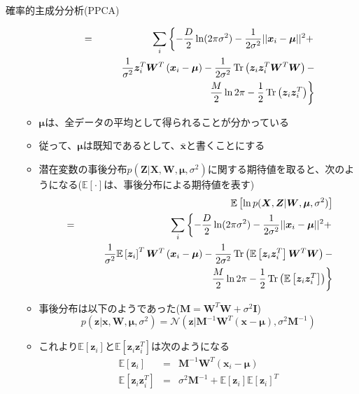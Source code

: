 \documentclass[dvipdfmx,notheorems,t]{beamer}
\begin{document}
\begin{frame}{確率的主成分分析(PPCA)}
\begin{itemize}
\begin{itemize}
\begin{eqnarray}
			&=& \sum_i \left\{ -\frac{D}{2} \ln (2\pi \sigma^2) - \frac{1}{2 \sigma^2} || \bm{x}_i - \bm{\mu} ||^2 + \right. \nonumber \\
			&& \qquad \frac{1}{\sigma^2} \bm{z}_i^T \bm{W}^T \left( \bm{x}_i - \bm{\mu} \right) - \frac{1}{2 \sigma^2} \operatorname{Tr} \left( \bm{z}_i \bm{z}_i^T \bm{W}^T \bm{W} \right) - \nonumber \\
			&& \qquad \left. \frac{M}{2} \ln 2\pi - \frac{1}{2} \operatorname{Tr} \left( \bm{z}_i \bm{z}_i^T \right) \right\}
		\end{eqnarray}
		
		\item $\bm{\mu}$は、全データの平均として得られることが分かっている
		\item 従って、$\bm{\mu}$は既知であるとして、$\bar{\bm{x}}$と書くことにする
		\newline
		
		\item 潜在変数の事後分布$p(\bm{Z} | \bm{X}, \bm{W}, \bm{\mu}, \sigma^2)$に関する期待値を取ると、次のようになる($\mathbb{E} \left[ \cdot \right]$は、事後分布による期待値を表す)
		\begin{eqnarray}
			&& \mathbb{E} \left[ \ln p(\bm{X}, \bm{Z} | \bm{W}, \bm{\mu}, \sigma^2) \right] \nonumber \\
			&=& \sum_i \left\{ -\frac{D}{2} \ln (2\pi \sigma^2) - \frac{1}{2 \sigma^2} || \bm{x}_i - \bm{\mu} ||^2 + \right. \nonumber \\
			&& \qquad \frac{1}{\sigma^2} \mathbb{E} \left[ \bm{z}_i \right]^T \bm{W}^T \left( \bm{x}_i - \bm{\mu} \right) - \frac{1}{2 \sigma^2} \operatorname{Tr} \left( \mathbb{E} \left[ \bm{z}_i \bm{z}_i^T \right] \bm{W}^T \bm{W} \right) - \nonumber \\
			&& \qquad \left. \frac{M}{2} \ln 2\pi - \frac{1}{2} \operatorname{Tr} \left( \mathbb{E} \left[ \bm{z}_i \bm{z}_i^T \right] \right) \right\}
		\end{eqnarray}
		
		\item 事後分布は以下のようであった($\bm{M} = \bm{W}^T \bm{W} + \sigma^2 \bm{I}$)
		\begin{equation}
			p(\bm{z} | \bm{x}, \bm{W}, \bm{\mu}, \sigma^2) = \mathcal{N}(\bm{z} | \bm{M}^{-1} \bm{W}^T (\bm{x} - \bm{\mu}), \sigma^2 \bm{M}^{-1})
		\end{equation}
		
		\item これより$\mathbb{E} \left[ \bm{z}_i \right]$と$\mathbb{E} \left[ \bm{z}_i \bm{z}_i^T \right]$は次のようになる
		\begin{eqnarray}
			\mathbb{E} \left[ \bm{z}_i \right] &=& \bm{M}^{-1} \bm{W}^T \left( \bm{x}_i - \bm{\mu} \right) \\
			\mathbb{E} \left[ \bm{z}_i \bm{z}_i^T \right] &=& \sigma^2 \bm{M}^{-1} + \mathbb{E} \left[ \bm{z}_i \right] \mathbb{E} \left[ \bm{z}_i \right]^T
		\end{eqnarray}
		

\end{itemize}
\end{itemize}
\end{frame}
\end{document}

